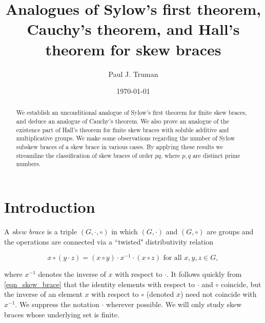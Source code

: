 \documentclass[12pt,a4paper, reqno]{amsart}
\theoremstyle{definition}
\renewcommand{\bar}{\overline}
\begin{document}
\title[Sylow's theorem, Cauchy's theorem, Hall's theorem for skew braces]{Analogues of Sylow's first theorem, Cauchy's theorem, and Hall's theorem for skew braces}

\author{Paul J. Truman}
\address{School of Computer Science and Mathematics \\ Keele University \\ Staffordshire \\ ST5 5BG \\ UK}
\date{\today}



\maketitle

\begin{abstract}
We establish an unconditional analogue of Sylow's first theorem for finite skew braces, and deduce an analogue of Cauchy's theorem. We also prove an analogue of the existence part of Hall's theorem for finite skew braces with soluble additive and multiplicative groups. We make some observations regarding the number of Sylow subskew braces of a skew brace in various cases. By applying these results we streamline the classification of skew braces of order $ pq $, where $ p,q $ are distinct prime numbers. 
\end{abstract}

\section{Introduction}

A \textit{skew brace} is a triple $ (G,\cdot,\circ) $ in which $ (G,\cdot) $ and $ (G,\circ) $ are groups and the operations are connected via a ``twisted" distributivity relation

\begin{equation} \label{eqn_skew_brace}
x \circ (y \cdot z) = (x \circ y) \cdot x^{-1} \cdot (x \circ z) \mbox{ for all } x,y,z \in G,
\end{equation}

\noindent where $ x^{-1} $ denotes the inverse of $ x $ with respect to $ \cdot $. It follows quickly from \eqref{eqn_skew_brace} that the identity elements with respect to $ \cdot $ and $ \circ $ coincide, but the inverse of an element $ x $ with respect to $ \circ $ (denoted $ \bar{x} $) need not coincide with $ x^{-1} $. We suppress the notation $ \cdot $ wherever possible. We will only study skew braces whose underlying set is finite. 
\end{document}
